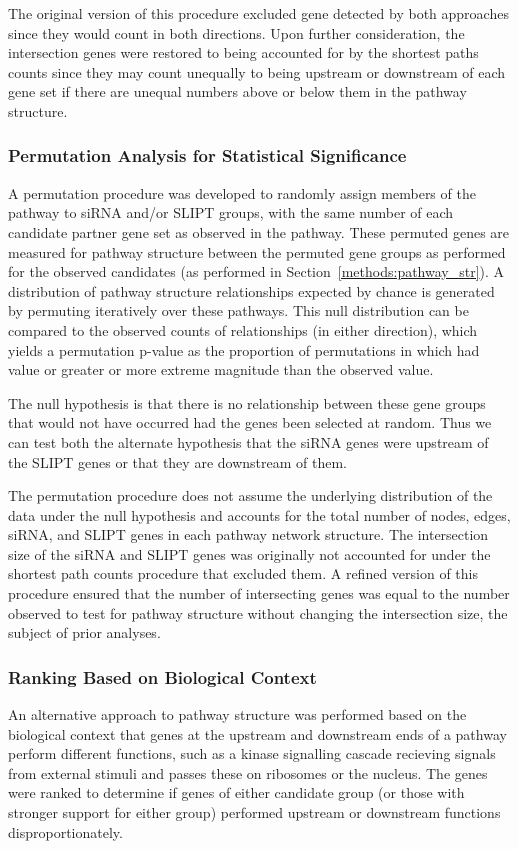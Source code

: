 The original version of this procedure excluded gene detected by both approaches since they would count in both directions. Upon further consideration, the intersection genes were restored to being accounted for by the shortest paths counts since they may count unequally to being upstream or downstream of each gene set if there are unequal numbers above or below them in the pathway structure.

\subsubsection{Permutation Analysis for Statistical Significance} \label{methods:network_permutation}
A permutation procedure was developed to randomly assign members of the pathway to \gls{siRNA} and/or \gls{SLIPT} groups, with the same number of each candidate partner gene set as observed in the pathway. These permuted genes are measured for pathway structure between the permuted gene groups as performed for the observed candidates (as performed in Section~\ref{methods:pathway_str}). A distribution of pathway structure relationships expected by chance is generated by permuting iteratively over these pathways. This null distribution can be compared to the observed counts of relationships (in either direction), which yields a permutation p-value as the proportion of permutations in which had value or greater or more extreme magnitude than the observed value.

The null hypothesis is that there is no relationship between these gene groups that would not have occurred had the genes been selected at random. Thus we can test both the alternate hypothesis that the \gls{siRNA} genes were upstream of the \gls{SLIPT} genes or that they are downstream of them.

The permutation procedure does not assume the underlying distribution of the data under the null hypothesis and accounts for the total number of nodes, edges, \gls{siRNA}, and \gls{SLIPT} genes in each pathway network structure. The intersection size of the \gls{siRNA} and \gls{SLIPT} genes was originally not accounted for under the shortest path counts procedure that excluded them. A refined version of this procedure ensured that the number of intersecting genes was equal to the number observed to test for pathway structure without changing the intersection size, the subject of prior analyses.

\subsubsection{Ranking Based on Biological Context} \label{methods:pathway_rank}
An alternative approach to pathway structure was performed based on the biological context that genes at the upstream and downstream ends of a pathway perform different functions, such as a kinase signalling cascade recieving signals from external stimuli and passes these on ribosomes or the nucleus. The genes were ranked to determine if genes of either candidate group (or those with stronger support for either group) performed upstream or downstream functions disproportionately.

